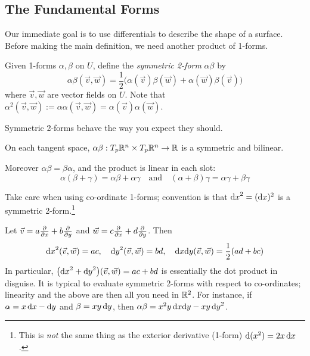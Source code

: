 \subsection{The Fundamental Forms}\label{sec:fund}

Our immediate goal is to use differentials to describe the shape of a surface. Before making the main definition, we need  another product of 1-forms.

\begin{defn}{}{}
Given 1-forms $\alpha,\beta$ on $U$, define the \emph{symmetric 2-form} $\alpha\beta$ by
\[\alpha\beta(\vec v,\vec w)=\frac{1}{2}\bigl(\alpha(\vec v)\beta(\vec w)+\alpha(\vec w)\beta(\vec v)\bigr)\]
where $\vec v,\vec w$ are vector fields on $U$. Note that $\alpha^2(\vec v,\vec w):=\alpha\alpha(\vec v,\vec w)=\alpha(\vec v)\alpha(\vec w)$.
\end{defn}

Symmetric 2-forms behave the way you expect they should.

\begin{lemm}{}{}
On each tangent space, $\alpha\beta:T_p\mathbb{R}^n\times T_p\mathbb{R}^n\to\mathbb{R}$ is a symmetric and bilinear.\par
Moreover $\alpha\beta=\beta\alpha$, and the product is linear in each slot:
\[\alpha(\beta+\gamma)=\alpha\beta+\alpha\gamma\quad\text{and}\quad (\alpha+\beta)\gamma=\alpha\gamma+\beta\gamma\]
\end{lemm}


Take care when using co-ordinate 1-forms; convention is that ${\mathrm{d} x}^2=({\mathrm{d} x})^2$ is a symmetric 2-form.\footnote{This is \emph{not} the same thing as the exterior derivative (1-form) $\mathrm{d}(x^2)=2x\,{\mathrm{d} x}$.}

\begin{example}{}{}
Let $\vec v=a\frac{\partial }{\partial x}+b\frac{\partial }{\partial y}$ and $\vec w=c\frac{\partial }{\partial x}+d\frac{\partial }{\partial y}$. Then
\[{\mathrm{d} x}^2(\vec v,\vec w)=ac,\quad {\mathrm{d}y}^2(\vec v,\vec w)=bd,\quad {\mathrm{d}x}{\mathrm{d}y}(\vec v,\vec w)=\frac 12(ad+bc)\]
In particular, $\bigl({\mathrm{d} x}^2+{\mathrm{d} y}^2\bigr)(\vec v,\vec w)=ac+bd$ is essentially the dot product in disguise.\smallbreak
It is typical to evaluate symmetric 2-forms with respect to co-ordinates; linearity and the above are then all you need in $\mathbb{R}^2$. For instance, if $\alpha =x\,{\mathrm{d} x}-{\mathrm{d} y}$ and $\beta =xy\,{\mathrm{d} y}$, then $\alpha\beta=x^2y\,{\mathrm{d} x}{\mathrm{d} y}-xy\,{\mathrm{d} y}^2$.
\end{example}

